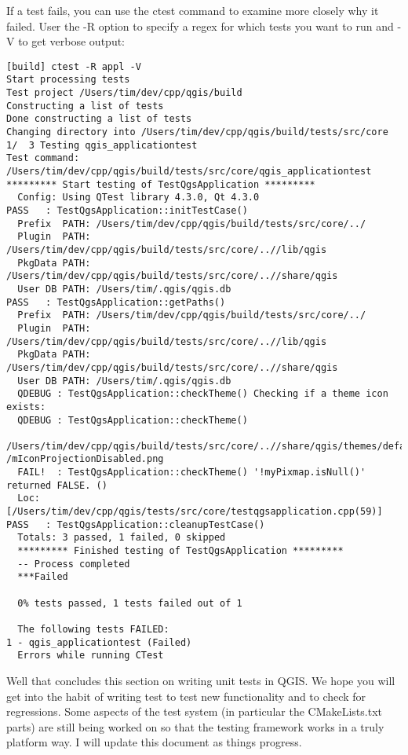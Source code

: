 If a test fails, you can use the ctest command to examine more closely why it
failed. User the -R option to specify a regex for which tests you want to run
and -V to get verbose output:

\begin{verbatim}
[build] ctest -R appl -V
Start processing tests
Test project /Users/tim/dev/cpp/qgis/build
Constructing a list of tests
Done constructing a list of tests
Changing directory into /Users/tim/dev/cpp/qgis/build/tests/src/core
1/  3 Testing qgis_applicationtest          
Test command: /Users/tim/dev/cpp/qgis/build/tests/src/core/qgis_applicationtest
********* Start testing of TestQgsApplication *********
  Config: Using QTest library 4.3.0, Qt 4.3.0
PASS   : TestQgsApplication::initTestCase()
  Prefix  PATH: /Users/tim/dev/cpp/qgis/build/tests/src/core/../
  Plugin  PATH: /Users/tim/dev/cpp/qgis/build/tests/src/core/..//lib/qgis
  PkgData PATH: /Users/tim/dev/cpp/qgis/build/tests/src/core/..//share/qgis
  User DB PATH: /Users/tim/.qgis/qgis.db
PASS   : TestQgsApplication::getPaths()
  Prefix  PATH: /Users/tim/dev/cpp/qgis/build/tests/src/core/../
  Plugin  PATH: /Users/tim/dev/cpp/qgis/build/tests/src/core/..//lib/qgis
  PkgData PATH: /Users/tim/dev/cpp/qgis/build/tests/src/core/..//share/qgis
  User DB PATH: /Users/tim/.qgis/qgis.db
  QDEBUG : TestQgsApplication::checkTheme() Checking if a theme icon exists:
  QDEBUG : TestQgsApplication::checkTheme() 
  /Users/tim/dev/cpp/qgis/build/tests/src/core/..//share/qgis/themes/default/
/mIconProjectionDisabled.png
  FAIL!  : TestQgsApplication::checkTheme() '!myPixmap.isNull()' returned FALSE. ()
  Loc: [/Users/tim/dev/cpp/qgis/tests/src/core/testqgsapplication.cpp(59)]
PASS   : TestQgsApplication::cleanupTestCase()
  Totals: 3 passed, 1 failed, 0 skipped
  ********* Finished testing of TestQgsApplication *********
  -- Process completed
  ***Failed

  0% tests passed, 1 tests failed out of 1

  The following tests FAILED:
1 - qgis_applicationtest (Failed)
  Errors while running CTest
\end{verbatim}

Well that concludes this section on writing unit tests in QGIS. We hope you
will get into the habit of writing test to test new functionality and to check
for regressions. Some aspects of the test system (in particular the
CMakeLists.txt parts) are still being worked on so that the testing framework
works in a truly platform way. I will update this document as things
progress.


